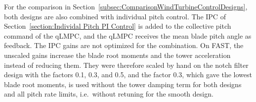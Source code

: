For the comparison in Section~\ref{subsec:ComparisonWindTurbineControlDesigns}, both designs are also combined with individual pitch control. The IPC of Section~\ref{section:Individal Pitch PI Control} is added to the collective pitch command of the qLMPC, and the qLMPC receives the mean blade pitch angle as feedback. The IPC gains are not optimized for the combination. On FAST, the unscaled gains increase the blade root moments and the tower acceleration instead of reducing them. They were therefore scaled by hand on the notch filter design with the factors 0.1, 0.3, and 0.5, and the factor 0.3, which gave the lowest blade root moments, is used without the tower damping term for both designs and all pitch rate limits, i.e.\ without retuning for the smooth design.

